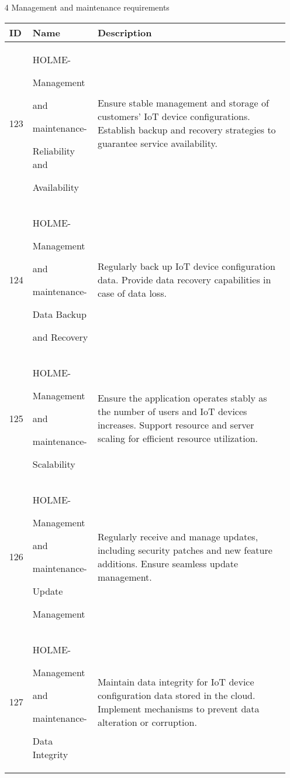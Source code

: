 \documentclass[conference]{IEEEtran}
\begin{document}
\begin{enumerate}
\item[4] Management and maintenance requirements
\begin{table}[h]
\def\arraystretch{1.2} \small
    \begin{tabular}{|p{1cm}|p{1.8cm}|p{5.0cm}|}
        \hline
        ID & Name & Description\\ \hline
        123 \par  & HOLME-\par Management \par and \par maintenance-\par Reliability and \par Availability& Ensure stable management and storage of customers' IoT device configurations. Establish backup and recovery strategies to guarantee service availability.
  \\ \hline
        124\par  & HOLME-\par Management \par and \par maintenance- \par Data Backup \par and Recovery & Regularly back up IoT device configuration data. Provide data recovery capabilities in case of data loss. \\ \hline
        125 \par  & HOLME-\par Management \par and \par maintenance- \par Scalability & Ensure the application operates stably as the number of users and IoT devices increases. Support resource and server scaling for efficient resource utilization. \\ \hline
        126 \par  & HOLME-\par Management \par and \par maintenance- \par Update \par Management& Regularly receive and manage updates, including security patches and new feature additions. Ensure seamless update management. \\ \hline
        127 \par  & HOLME-\par Management \par and \par maintenance- \par Data Integrity & Maintain data integrity for IoT device configuration data stored in the cloud. Implement mechanisms to prevent data alteration or corruption. \\ \hline

\end{tabular}
\end{table}
\end{enumerate}
\end{document}
